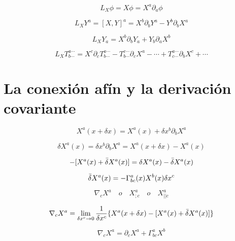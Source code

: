 \documentclass[../main]{subfiles}
\begin{document}
\begin{equation}
    L_X \phi= X \phi=X^a \partial_a \phi
\end{equation}

\begin{equation}
    L_X Y^a=[X, Y]^a=X^b \partial_b Y^a-Y^b \partial_b X^a
\end{equation}

\begin{equation}
    L_X Y_a=X^b \partial_b Y_a+Y_b \partial_a X^b
\end{equation}

\begin{equation}
    L_X T_{b \cdots}^{a \cdots}=X^c \partial_c T_{b \cdots}^{a \cdots}-T_{b \cdots}^{c \cdots} \partial_c X^a- \cdots + T_{c \cdots}^{a \cdots} \partial_b X^c + \cdots
\end{equation}

\section{La conexión afín y la derivación covariante}

\begin{equation}
    X^a(x+\delta x)=X^a(x)+\delta x^b \partial_b X^a
\end{equation}

\begin{equation}
    \delta X^a (x)=\delta x^b \partial_b X^a=X^a(x+\delta x)-X^a(x)
\end{equation}

\begin{equation}
    [X^a(x)+\delta X^a(x)]-[X^a(x)+\Bar{\delta} X^a(x)]=\delta X^a (x)-\Bar{\delta} X^a (x)
\end{equation}

\begin{equation}
    \Bar{\delta} X^a(x)=-\Gamma_{bc}^{a}(x) X^b(x) \delta x^c
\end{equation}

\begin{equation*}
    \nabla_c X^a \quad o \quad X^a_{;c} \quad o \quad X^a_{||c}
\end{equation*}

\begin{equation*}
    \nabla_c X^a=\lim_{\delta x^c \rightarrow 0} \dfrac{1}{\delta x^c} \{ X^a (x+\delta x)-[X^a(x)+\Bar{\delta} X^a(x)]\}
\end{equation*}

\begin{equation}
    \nabla_c X^a= \partial_c X^a+ \Gamma_{bc}^a X^b
\end{equation}
\end{document}

